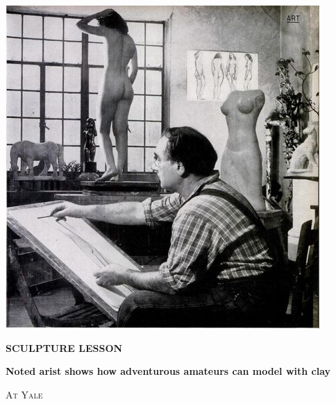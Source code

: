 \begin{minipage}{\textwidth}
\includegraphics[width=\textwidth]{./images/sculpture-lesson.jpg}\par
\vspace{\baselineskip}

\centerline{\HUGE\bfseries SCULPTURE LESSON}
\vspace{0.5\baselineskip}

\centerline{\LARGE\bfseries Noted arist shows how adventurous amateurs can model with clay }

\end{minipage}

{
\columnsep-1.3cm\par\leavevmode

\begin{multicols}{3}
        \lettrine{A}{t Yale} \lorem \lorem \lorem \lorem
        
\end{multicols}
}


\pagebreak





